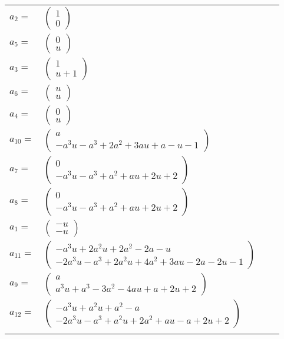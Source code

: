 \documentclass[1p]{elsarticle_modified}
\theoremstyle{definition}
\begin{document}
\begin{tabular}{m{7pt} m{180pt} m{7pt} m{180pt} }
\flushright $a_{2}=$&$\begin{pmatrix}1\\0\end{pmatrix}$ \\
\flushright $a_{5}=$&$\begin{pmatrix}0\\u\end{pmatrix}$ \\
\flushright $a_{3}=$&$\begin{pmatrix}1\\u+1\end{pmatrix}$ \\
\flushright $a_{6}=$&$\begin{pmatrix}u\\u\end{pmatrix}$ \\
\flushright $a_{4}=$&$\begin{pmatrix}0\\u\end{pmatrix}$ \\
\flushright $a_{10}=$&$\begin{pmatrix}a\\- a^3 u- a^3+2 a^2+3 a u+a- u-1\end{pmatrix}$ \\
\flushright $a_{7}=$&$\begin{pmatrix}0\\- a^3 u- a^3+a^2+a u+2 u+2\end{pmatrix}$ \\
\flushright $a_{8}=$&$\begin{pmatrix}0\\- a^3 u- a^3+a^2+a u+2 u+2\end{pmatrix}$ \\
\flushright $a_{1}=$&$\begin{pmatrix}- u\\- u\end{pmatrix}$ \\
\flushright $a_{11}=$&$\begin{pmatrix}- a^3 u+2 a^2 u+2 a^2-2 a- u\\-2 a^3 u- a^3+2 a^2 u+4 a^2+3 a u-2 a-2 u-1\end{pmatrix}$ \\
\flushright $a_{9}=$&$\begin{pmatrix}a\\a^3 u+a^3-3 a^2-4 a u+a+2 u+2\end{pmatrix}$ \\
\flushright $a_{12}=$&$\begin{pmatrix}- a^3 u+a^2 u+a^2- a\\-2 a^3 u- a^3+a^2 u+2 a^2+a u- a+2 u+2\end{pmatrix}$\\&\end{tabular}
\end{document}
